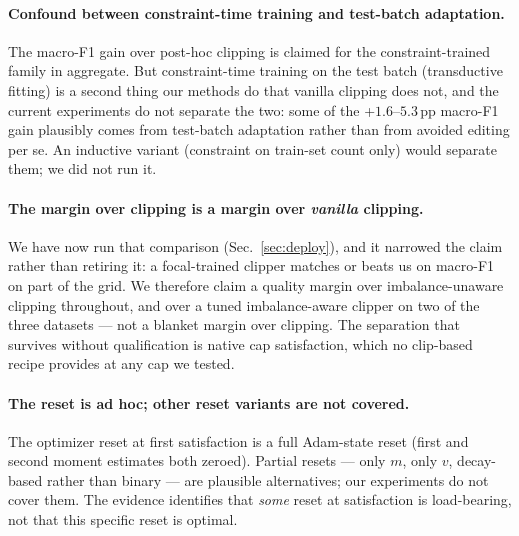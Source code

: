 \documentclass[10pt]{article}
\begin{document}
\paragraph{Confound between constraint-time training and test-batch
adaptation.} The macro-F1 gain over post-hoc clipping is claimed for the
constraint-trained family in aggregate. But constraint-time training on
the test batch (transductive fitting) is a second thing our methods do
that vanilla clipping does not, and the current experiments do not
separate the two: some of the +$1.6$--$5.3$\,pp macro-F1 gain plausibly
comes from test-batch adaptation rather than from avoided editing per
se. An inductive variant (constraint on train-set count only) would
separate them; we did not run it.

{\paragraph{The margin over clipping is a margin over \emph{vanilla} clipping.}
We have now run that comparison (Sec.~\ref{sec:deploy}), and it narrowed the claim
rather than retiring it: a focal-trained clipper matches or beats us on macro-F1 on
part of the grid. We therefore claim a quality margin over imbalance-unaware
clipping throughout, and over a tuned imbalance-aware clipper on two of the three
datasets --- not a blanket margin over clipping. The separation that survives
without qualification is native cap satisfaction, which no clip-based recipe
provides at any cap we tested.}

\paragraph{The reset is ad hoc; other reset variants are not covered.}
The optimizer reset at first satisfaction is a full Adam-state reset
(first and second moment estimates both zeroed). Partial resets --- only
$m$, only $v$, decay-based rather than binary --- are plausible
alternatives; our experiments do not cover them. The evidence identifies
that \emph{some} reset at satisfaction is load-bearing, not that this
specific reset is optimal.
\end{document}
